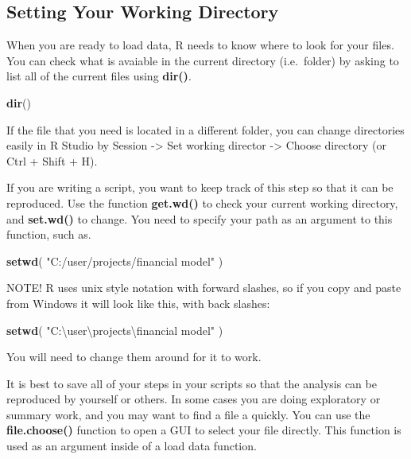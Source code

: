 \documentclass[]{book}
\newenvironment{Shaded}{\begin{snugshade}}{\end{snugshade}}
\newcommand{\CharTok}[1]{\textcolor[rgb]{0.31,0.60,0.02}{#1}}
\newcommand{\KeywordTok}[1]{\textcolor[rgb]{0.13,0.29,0.53}{\textbf{#1}}}
\newcommand{\NormalTok}[1]{#1}
\newcommand{\StringTok}[1]{\textcolor[rgb]{0.31,0.60,0.02}{#1}}
\theoremstyle{definition}
\theoremstyle{definition}
\theoremstyle{definition}
\theoremstyle{remark}
\begin{document}
\hypertarget{setting-your-working-directory}{%
\subsection{Setting Your Working
Directory}\label{setting-your-working-directory}}

When you are ready to load data, R needs to know where to look for your
files. You can check what is avaiable in the current directory
(i.e.~folder) by asking to list all of the current files using
\textbf{dir()}.

\begin{Shaded}
\begin{Highlighting}[]
\KeywordTok{dir}\NormalTok{()}
\end{Highlighting}
\end{Shaded}

If the file that you need is located in a different folder, you can
change directories easily in R Studio by Session -\textgreater{} Set
working director -\textgreater{} Choose directory (or Ctrl + Shift + H).

If you are writing a script, you want to keep track of this step so that
it can be reproduced. Use the function \textbf{get.wd()} to check your
current working directory, and \textbf{set.wd()} to change. You need to
specify your path as an argument to this function, such as.

\begin{Shaded}
\begin{Highlighting}[]
\KeywordTok{setwd}\NormalTok{( }\StringTok{"C:/user/projects/financial model"}\NormalTok{ )}
\end{Highlighting}
\end{Shaded}

NOTE! R uses unix style notation with forward slashes, so if you copy
and paste from Windows it will look like this, with back slashes:

\begin{Shaded}
\begin{Highlighting}[]
\KeywordTok{setwd}\NormalTok{( }\StringTok{"C:\textbackslash{}user\textbackslash{}projects}\CharTok{\textbackslash{}f}\StringTok{inancial model"}\NormalTok{ )}
\end{Highlighting}
\end{Shaded}

You will need to change them around for it to work.

It is best to save all of your steps in your scripts so that the
analysis can be reproduced by yourself or others. In some cases you are
doing exploratory or summary work, and you may want to find a file a
quickly. You can use the \textbf{file.choose()} function to open a GUI
to select your file directly. This function is used as an argument
inside of a load data function.
\end{document}
